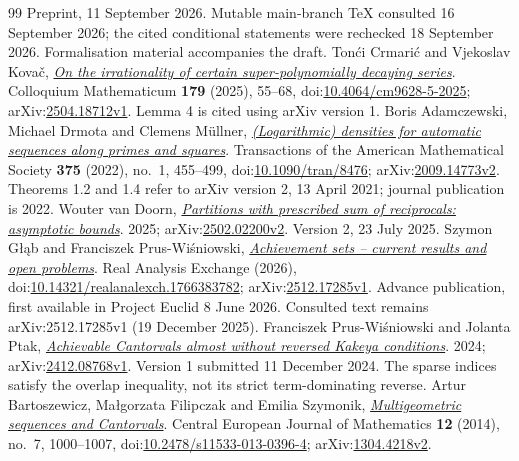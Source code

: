 \begin{thebibliography}{99}
  Preprint, 11 September 2026. Mutable main-branch TeX consulted 16 September 2026; the cited conditional statements were rechecked 18 September 2026. Formalisation material accompanies the draft.
 Ton\'{c}i Crmari\'{c} and Vjekoslav Kova\v{c}, \href{https://arxiv.org/abs/2504.18712v1}{\emph{On the irrationality of certain super-polynomially decaying series}}.
  Colloquium Mathematicum \textbf{179} (2025), 55--68, doi:\href{https://doi.org/10.4064/cm9628-5-2025}{10.4064/cm9628-5-2025}; arXiv:\href{https://arxiv.org/abs/2504.18712v1}{2504.18712v1}. Lemma 4 is cited using arXiv version 1.
 Boris Adamczewski, Michael Drmota and Clemens M\"ullner, \href{https://arxiv.org/abs/2009.14773v2}{\emph{(Logarithmic) densities for automatic sequences along primes and squares}}.
  Transactions of the American Mathematical Society \textbf{375} (2022), no.~1, 455--499, doi:\href{https://doi.org/10.1090/tran/8476}{10.1090/tran/8476}; arXiv:\href{https://arxiv.org/abs/2009.14773v2}{2009.14773v2}. Theorems 1.2 and 1.4 refer to arXiv version 2, 13 April 2021; journal publication is 2022.
 Wouter van Doorn, \href{https://arxiv.org/abs/2502.02200v2}{\emph{Partitions with prescribed sum of reciprocals: asymptotic bounds}}.
  2025; arXiv:\href{https://arxiv.org/abs/2502.02200v2}{2502.02200v2}. Version 2, 23 July 2025. 
 Szymon G{\l}\k{a}b and Franciszek Prus-Wi\'sniowski, \href{https://arxiv.org/abs/2512.17285v1}{\emph{Achievement sets -- current results and open problems}}.
  Real Analysis Exchange (2026), doi:\href{https://doi.org/10.14321/realanalexch.1766383782}{10.14321/realanalexch.1766383782}; arXiv:\href{https://arxiv.org/abs/2512.17285v1}{2512.17285v1}. Advance publication, first available in Project Euclid 8 June 2026. Consulted text remains arXiv:2512.17285v1 (19 December 2025).
 Franciszek Prus-Wi\'sniowski and Jolanta Ptak, \href{https://arxiv.org/abs/2412.08768v1}{\emph{Achievable Cantorvals almost without reversed Kakeya conditions}}.
  2024; arXiv:\href{https://arxiv.org/abs/2412.08768v1}{2412.08768v1}. Version 1 submitted 11 December 2024. The sparse indices satisfy the overlap inequality, not its strict term-dominating reverse.
 Artur Bartoszewicz, Ma{\l}gorzata Filipczak and Emilia Szymonik, \href{https://arxiv.org/abs/1304.4218v2}{\emph{Multigeometric sequences and Cantorvals}}.
  Central European Journal of Mathematics \textbf{12} (2014), no.~7, 1000--1007, doi:\href{https://doi.org/10.2478/s11533-013-0396-4}{10.2478/s11533-013-0396-4}; arXiv:\href{https://arxiv.org/abs/1304.4218v2}{1304.4218v2}.

\end{thebibliography}
